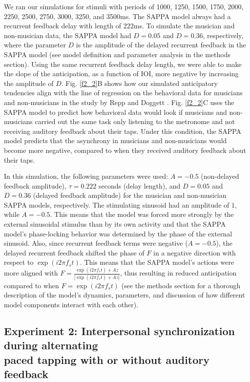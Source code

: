 \documentclass{report}
\begin{document}
We ran our simulations for stimuli with periods of 1000, 1250, 1500, 1750, 2000, 2250, 2500, 2750, 3000, 3250, and 3500ms. The SAPPA model always had a recurrent feedback delay with length of 222ms. To simulate the musician and non-musician data, the SAPPA model had $D = 0.05$ and $D = 0.36$, respectively, where the parameter $D$ is the amplitude of the delayed recurrent feedback in the SAPPA model (see model definition and parameter analysis in the methods section). Using the same recurrent feedback delay length, we were able to make the slope of the anticipation, as a function of IOI, more negative by increasing the amplitude of $D$. Fig.{} \ref{f2_2}B shows how our simulated anticipatory tendencies align with the line of regression on the behavioral data for musicians and non-musicians in the study by Repp and Doggett \cite{repp2007tapping}. Fig.{} \ref{f2_2}C uses the SAPPA model to predict how behavioral data would look if musicians and non-musicians carried out the same task only listening to the metronome and not receiving auditory feedback about their taps. Under this condition, the SAPPA model predicts that the asynchrony in musicians and non-musicians would become more negative, compared to when they received auditory feedback about their taps.

In this simulation, the following parameters were used: $A = -0.5$ (non-delayed feedback amplitude), $\tau = 0.222$ seconds (delay length), and $D = 0.05$ and $D = 0.36$ (delayed feedback amplitude) for the musician and non-musician SAPPA models, respectively. The stimulating sinusoid had an amplitude of $1$, while $A = -0.5$. This means that the model was forced more strongly by the external sinusoidal stimulus than by its own activity and that the SAPPA model's phase-locking behavior was determined by the phase of the external sinusoid. Also, since recurrent feedback terms were negative ($A = -0.5$), the delayed recurrent feedback shifted the phase of $F$ in a negative direction with respect to $\exp(i2\pi f_s t)$. This means that the SAPPA model's actions were more aligned with $F = \frac{\exp(i2\pi f_s t)+Az}{|\exp(i2\pi f_s t)+Az|}$, thus resulting in reduced anticipation compared to when $F = \exp(i2\pi f_s t)$ (see the methods section for a thorough description of the model's dynamics, parameters, and discussion of how different model components interact with each other).

\subsection{Experiment 2: Interpersonal synchronization during alternating \\ paced tapping with or without auditory feedback}
\end{document}
